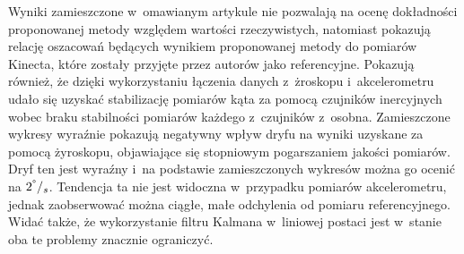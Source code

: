 Wyniki zamieszczone w~omawianym artykule \cite{Bo2011a} nie pozwalają na ocenę dokładności proponowanej metody względem wartości rzeczywistych, natomiast pokazują relację oszacowań będących wynikiem proponowanej metody do pomiarów Kinecta, które zostały przyjęte przez autorów jako referencyjne. Pokazują również, że dzięki wykorzystaniu łączenia danych z~żroskopu i~akcelerometru udało się uzyskać stabilizację pomiarów kąta za pomocą czujników inercyjnych wobec braku stabilności pomiarów każdego z~czujników z~osobna. Zamieszczone wykresy wyraźnie pokazują negatywny wpływ dryfu na wyniki uzyskane za pomocą żyroskopu, objawiające się stopniowym pogarszaniem jakości pomiarów. Dryf ten jest wyraźny i~na podstawie zamieszczonych wykresów można go ocenić na $2^\degree/_s$. Tendencja ta nie jest widoczna w~przypadku pomiarów akcelerometru, jednak zaobserwować można ciągłe, małe odchylenia od pomiaru referencyjnego. Widać także, że wykorzystanie filtru Kalmana w~liniowej postaci jest w~stanie oba te problemy znacznie ograniczyć.\\
		
